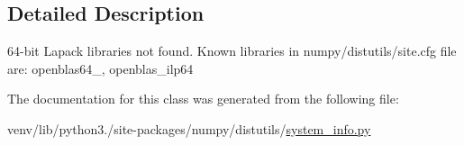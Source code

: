 \subsection{Detailed Description}
\begin{DoxyVerb}64-bit Lapack libraries not found.
Known libraries in numpy/distutils/site.cfg file are:
openblas64_, openblas_ilp64
\end{DoxyVerb}
 

The documentation for this class was generated from the following file\+:\begin{DoxyCompactItemize}
\item 
venv/lib/python3./site-\/packages/numpy/distutils/\hyperlink{system__info_8py}{system\+\_\+info.\+py}\end{DoxyCompactItemize}
